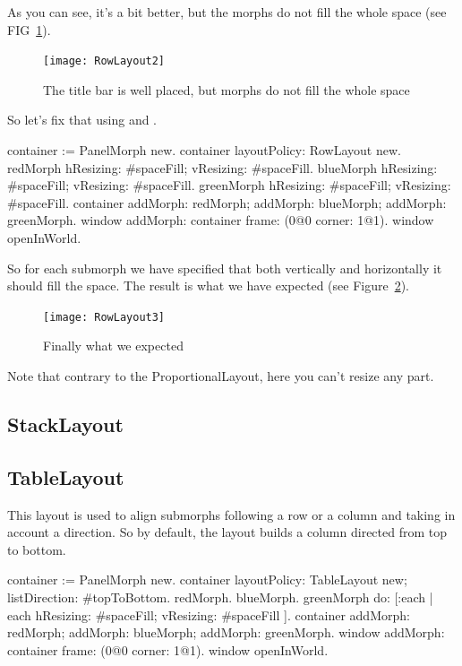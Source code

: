 \documentclass[a4paper,10pt,twoside]{book}
\begin{document}
As you can see, it's a bit better, but the morphs do not fill the whole space (see FIG~\ref{fig:rowLayout2}).

\begin{figure}[ht]\centering
	\texttt{[image: RowLayout2]}
	\caption{The title bar is well placed, but morphs do not fill the whole space}
	\label{fig:rowLayout2}
\end{figure}

So let's fix that using  and . 

\begin{code}{}
container := PanelMorph new.
container layoutPolicy: RowLayout new.
redMorph
	hResizing: #spaceFill;
	vResizing: #spaceFill.
blueMorph
	hResizing: #spaceFill;
	vResizing: #spaceFill.
greenMorph
	hResizing: #spaceFill;
	vResizing: #spaceFill.
container 
	addMorph: redMorph;
	addMorph: blueMorph;
	addMorph: greenMorph.
window
	addMorph: container
	frame: (0@0 corner: 1@1).
window openInWorld.
\end{code}

So for each submorph we have specified that both vertically and horizontally it should fill the space.
The result is what we have expected (see Figure~\ref{fig:rowLayout3}).

\begin{figure}[ht]\centering
	\texttt{[image: RowLayout3]}
	\caption{Finally what we expected}
	\label{fig:rowLayout3}
\end{figure}

Note that contrary to the ProportionalLayout, here you can't resize any part.

\subsection{StackLayout}


\subsection{TableLayout}
This layout is used to align submorphs following a row or a column and taking in account a direction.
So by default, the layout builds a column directed from top to bottom.
\begin{code}{}
container := PanelMorph new.
container 
	layoutPolicy: TableLayout new;
	listDirection: #topToBottom.
{ redMorph. blueMorph. greenMorph } do: [:each |
	each 
		hResizing: #spaceFill;
		vResizing: #spaceFill ].
container 
	addMorph: redMorph;
	addMorph: blueMorph;
	addMorph: greenMorph.
window
	addMorph: container
	frame: (0@0 corner: 1@1).
window openInWorld.
\end{code}
\end{document}
